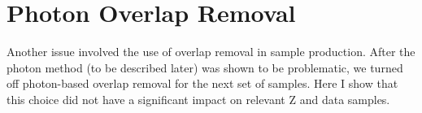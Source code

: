\section{Photon Overlap Removal}

Another issue involved the use of overlap removal in sample production. After the photon method (to be described later) was shown to be problematic, we turned off photon-based overlap removal for the next set of samples. Here I show that this choice did not have a significant impact on relevant Z and data samples.